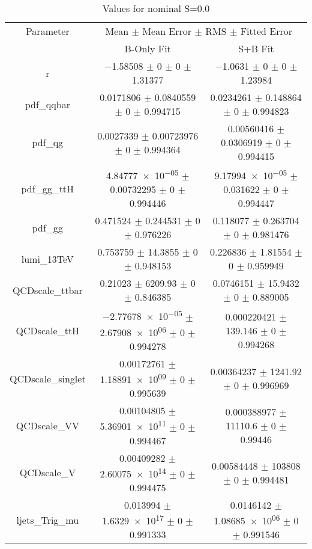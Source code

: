 \begin{table}
\centering
\caption{Values for nominal S=0.0}
\begin{tabular}{ccc}
\toprule
Parameter & \multicolumn{2}{c}{Mean $\pm$ Mean Error $\pm$ RMS $\pm$ Fitted Error}\\
 & B-Only Fit & S+B Fit\\
\midrule
r & \num{-1.58508} $\pm$ \num{0} $\pm$ \num{0} $\pm$ \num{1.31377} & \num{-1.0631} $\pm$ \num{0} $\pm$ \num{0} $\pm$ \num{1.23984}\\
pdf\_qqbar & \num{0.0171806} $\pm$ \num{0.0840559} $\pm$ \num{0} $\pm$ \num{0.994715} & \num{0.0234261} $\pm$ \num{0.148864} $\pm$ \num{0} $\pm$ \num{0.994823}\\
pdf\_qg & \num{0.0027339} $\pm$ \num{0.00723976} $\pm$ \num{0} $\pm$ \num{0.994364} & \num{0.00560416} $\pm$ \num{0.0306919} $\pm$ \num{0} $\pm$ \num{0.994415}\\
pdf\_gg\_ttH & \num{4.84777e-05} $\pm$ \num{0.00732295} $\pm$ \num{0} $\pm$ \num{0.994446} & \num{9.17994e-05} $\pm$ \num{0.031622} $\pm$ \num{0} $\pm$ \num{0.994447}\\
pdf\_gg & \num{0.471524} $\pm$ \num{0.244531} $\pm$ \num{0} $\pm$ \num{0.976226} & \num{0.118077} $\pm$ \num{0.263704} $\pm$ \num{0} $\pm$ \num{0.981476}\\
lumi\_13TeV & \num{0.753759} $\pm$ \num{14.3855} $\pm$ \num{0} $\pm$ \num{0.948153} & \num{0.226836} $\pm$ \num{1.81554} $\pm$ \num{0} $\pm$ \num{0.959949}\\
QCDscale\_ttbar & \num{0.21023} $\pm$ \num{6209.93} $\pm$ \num{0} $\pm$ \num{0.846385} & \num{0.0746151} $\pm$ \num{15.9432} $\pm$ \num{0} $\pm$ \num{0.889005}\\
QCDscale\_ttH & \num{-2.77678e-05} $\pm$ \num{2.67908e+06} $\pm$ \num{0} $\pm$ \num{0.994278} & \num{0.000220421} $\pm$ \num{139.146} $\pm$ \num{0} $\pm$ \num{0.994268}\\
QCDscale\_singlet & \num{0.00172761} $\pm$ \num{1.18891e+09} $\pm$ \num{0} $\pm$ \num{0.995639} & \num{0.00364237} $\pm$ \num{1241.92} $\pm$ \num{0} $\pm$ \num{0.996969}\\
QCDscale\_VV & \num{0.00104805} $\pm$ \num{5.36901e+11} $\pm$ \num{0} $\pm$ \num{0.994467} & \num{0.000388977} $\pm$ \num{11110.6} $\pm$ \num{0} $\pm$ \num{0.99446}\\
QCDscale\_V & \num{0.00409282} $\pm$ \num{2.60075e+14} $\pm$ \num{0} $\pm$ \num{0.994475} & \num{0.00584448} $\pm$ \num{103808} $\pm$ \num{0} $\pm$ \num{0.994481}\\
ljets\_Trig\_mu & \num{0.013994} $\pm$ \num{1.6329e+17} $\pm$ \num{0} $\pm$ \num{0.991333} & \num{0.0146142} $\pm$ \num{1.08685e+06} $\pm$ \num{0} $\pm$ \num{0.991546}\\

\end{tabular}
\end{table}
